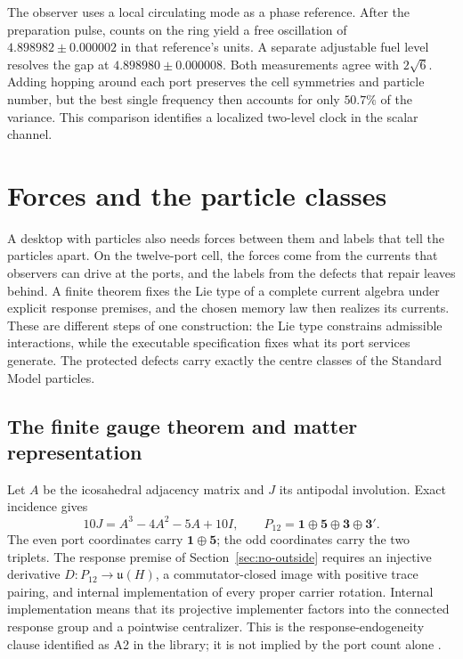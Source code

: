 \documentclass[11pt]{article}
\theoremstyle{definition}
\theoremstyle{remark}
\begin{document}
The observer uses a local circulating mode as a phase reference. After
the preparation pulse, counts on the ring yield a free oscillation of
$4.898982\pm0.000002$ in that reference's units. A separate adjustable
fuel level resolves the gap at $4.898980\pm0.000008$. Both measurements
agree with $2\sqrt{6}$. Adding hopping around each port preserves
the cell symmetries and particle number, but the best single frequency
then accounts for only $50.7\%$ of the variance. This comparison
identifies a localized two-level clock in the scalar channel.

\section{Forces and the particle classes}
\label{sec:gauge}

A desktop with particles also needs forces between them and labels that
tell the particles apart. On the twelve-port cell, the forces come from
the currents that observers can drive at the ports, and the labels from
the defects that repair leaves behind. A finite theorem fixes
the Lie type of a complete current algebra under explicit response
premises, and the chosen memory law then realizes its currents. These
are different steps of one construction: the Lie type constrains
admissible interactions, while the executable specification fixes what
its port services generate. The protected defects carry exactly the
centre classes of the Standard Model particles.

\subsection{The finite gauge theorem and matter representation}

Let $A$ be the icosahedral adjacency matrix and $J$ its antipodal involution.
Exact incidence gives
\begin{equation}
10J=A^3-4A^2-5A+10I,
\qquad P_{12}=\mathbf1\oplus\mathbf5\oplus\mathbf3\oplus\mathbf3'.
\label{eq:antipode-polynomial}
\end{equation}
The even port coordinates carry $\mathbf1\oplus\mathbf5$; the odd coordinates
carry the two triplets. The response premise of Section~\ref{sec:no-outside}
requires an injective derivative $D:P_{12}\to\mathfrak u(H)$, a
commutator-closed image with positive trace pairing, and internal implementation
of every proper carrier rotation. Internal implementation means that its
projective implementer factors into the connected response group and a
pointwise centralizer. This is the response-endogeneity clause identified
as A2 in the library; it is not implied by the port count alone
\cite{ophbasis,ophGauge}.
\end{document}
